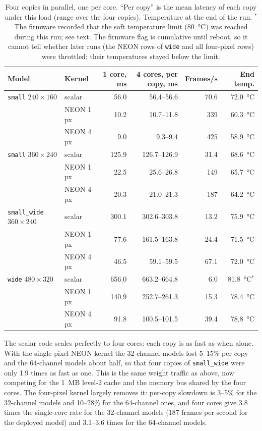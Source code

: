 \documentclass[11pt,a4paper]{article}
\newcommand{\cfg}[1]{\texttt{#1}}
\begin{document}
\begin{table}[h]
\centering
\caption{Four copies in parallel, one per core. ``Per copy'' is the mean latency
of each copy under this load (range over the four copies). Temperature at the end
of the run. $^{*}$The firmware recorded that the soft temperature limit
(\SI{80}{\celsius}) was reached during this run; see text. The firmware flag
is cumulative until reboot, so it cannot tell whether later runs (the NEON
rows of \cfg{wide} and all four-pixel rows) were throttled; their
temperatures stayed below the limit.}
\label{tab:throughput}
\begin{tabular}{llrrrr}
\toprule
Model & Kernel & 1 core, ms & 4 cores, per copy, ms & Frames/s & End temp. \\
\midrule
\cfg{small} $240 \times 160$ & scalar & 56.0 & 56.4--56.6 & 70.6 & \SI{72.0}{\celsius} \\
                              & NEON 1 px & 10.2 & 10.7--11.8 & 339 & \SI{60.3}{\celsius} \\
                              & NEON 4 px & 9.0 & 9.3--9.4 & 425 & \SI{58.9}{\celsius} \\
\cfg{small} $360 \times 240$ & scalar & 125.9 & 126.7--126.9 & 31.4 & \SI{68.6}{\celsius} \\
                              & NEON 1 px & 22.5 & 25.6--26.8 & 149 & \SI{65.7}{\celsius} \\
                              & NEON 4 px & 20.3 & 21.0--21.3 & 187 & \SI{64.2}{\celsius} \\
\cfg{small\_wide} $360 \times 240$ & scalar & 300.1 & 302.6--303.8 & 13.2 & \SI{75.9}{\celsius} \\
                              & NEON 1 px & 77.6 & 161.5--163.8 & 24.4 & \SI{71.5}{\celsius} \\
                              & NEON 4 px & 46.5 & 59.1--59.5 & 67.1 & \SI{72.0}{\celsius} \\
\cfg{wide} $480 \times 320$ & scalar & 656.0 & 663.2--664.8 & 6.0 & \SI{81.8}{\celsius}$^{*}$ \\
                              & NEON 1 px & 140.9 & 252.7--261.3 & 15.3 & \SI{78.4}{\celsius} \\
                              & NEON 4 px & 91.8 & 100.5--101.5 & 39.4 & \SI{78.8}{\celsius} \\
\bottomrule
\end{tabular}
\end{table}

The scalar code scales perfectly to four cores: each copy is as fast as when
alone. With the single-pixel NEON kernel the 32-channel models lost 5--15\%
per copy and the 64-channel models about half, so that four copies of
\cfg{small\_wide} were only 1.9 times as fast as one. This is the same weight
traffic as above, now competing for the \SI{1}{MB} level-2 cache and the
memory bus shared by the four cores. The four-pixel kernel largely removes
it: per-copy slowdown is 3--5\% for the 32-channel models and 10--28\% for the
64-channel ones, and four cores give 3.8 times the single-core rate for
the 32-channel models (187 frames per second for the deployed model) and
3.1--3.6 times for the 64-channel models.
\end{document}
